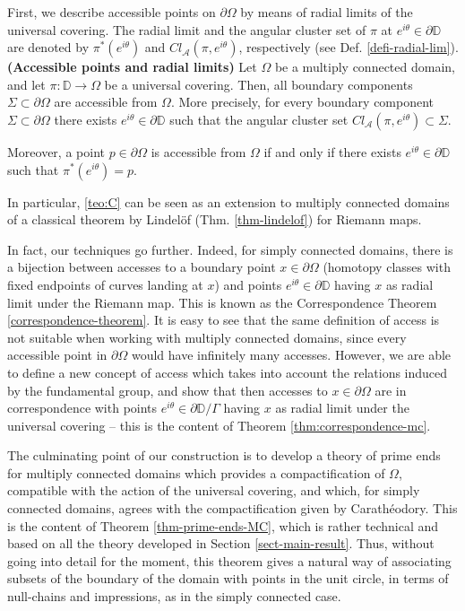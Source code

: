 \documentclass[11pt,a4paper,reqno]{amsart}
\makeatletter
\theoremstyle{plain}
\theoremstyle{definition}
\theoremstyle{plain}
\newcounter{namedthm}
\newenvironment{named}[1]
{\def\namedthmname{#1}%
	\refstepcounter{namedthm}%
	\namedthm\def\@currentlabel{#1}}
{\endnamedthm}
\makeatother
\begin{document}
First, we describe accessible points on  $\partial  \Omega $ by means of radial limits of the universal covering. The radial limit and the angular cluster set of $ \pi $ at $ e^{i\theta}\in\partial\mathbb{D} $ are denoted by $  \pi^*(e^{i\theta})$  and $ Cl_\mathcal{A}(\pi, e^{i\theta}) $, respectively (see Def. \ref{defi-radial-lim}).
\begin{named}{Theorem C}\label{teo:C}
	{\bf (Accessible points and radial limits)}
	Let $ \Omega $ be a multiply connected domain, and let $ \pi\colon\mathbb{D}\to\Omega $ be a universal covering. Then, all boundary components $ \Sigma\subset \partial \Omega $ are accessible from $ \Omega $.	More precisely, for every boundary component $ \Sigma\subset \partial \Omega $ there exists $ e^{i\theta}\in \partial \mathbb{D} $ such that the angular cluster set $ Cl_\mathcal{A}(\pi, e^{i\theta})\subset\Sigma $.
	
	\noindent Moreover, a point $ p\in\partial \Omega $ is accessible from $ \Omega $ if and only if there exists $ e^{i\theta}\in \partial \mathbb{D} $ such that $ \pi^* (e^{i\theta}) =p$. 
\end{named}

In particular, \ref{teo:C} can be seen as an extension to multiply connected domains of a classical theorem by Lindelöf (Thm. \ref{thm-lindelof}) for Riemann maps. 

In fact, our techniques go further. Indeed, for simply connected domains, there is a bijection between accesses to a boundary point $ x\in\partial\Omega $ (homotopy classes with fixed endpoints of curves landing at $ x $) and points $ e^{i\theta} \in\partial\mathbb{D}$ having $ x $ as radial limit under the Riemann map. This is known as the Correspondence Theorem \ref{correspondence-theorem}.
It is easy to see that the same definition of access is not suitable when working with multiply connected domains, since every accessible point in $ \partial\Omega $ would have infinitely many accesses. However, we are able to define a new concept of access which takes into account the relations induced by the fundamental group, and show that then accesses to $ x\in\partial \Omega $ are in correspondence with points $ e^{i\theta} \in\partial\mathbb{D}/\Gamma$ having $ x $ as radial limit under the universal covering
 -- this is the content of  Theorem \ref{thm:correspondence-mc}.

The culminating point of our construction is to develop a theory of prime ends for multiply connected domains which provides a compactification of $ \Omega $, compatible with the action of the universal covering, and which, for simply connected domains, agrees with the compactification given by Carathéodory. This is the content of Theorem \ref{thm-prime-ends-MC}, which is rather technical and based on all the theory developed in Section \ref{sect-main-result}. Thus, without going into detail for the moment, this theorem gives a natural way of associating subsets of the boundary of the domain with points in the unit circle, in terms of null-chains and impressions, as in the simply connected case.
 
\end{document}
